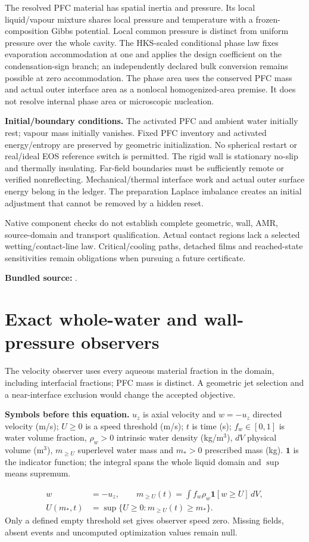\documentclass[10pt,a4paper]{article}
\newcommand{\symbols}[1]{\par\textbf{Symbols before this equation.} #1\par}
\newcommand{\source}[1]{\par{\small\textbf{Bundled source:} \path{#1}.}\par}
\newcommand{\nextsection}[1]{\clearpage\section{#1}}
\begin{document}
The resolved PFC material has spatial inertia and pressure. Its local liquid/vapour mixture shares local pressure and temperature with a frozen-composition Gibbs potential. Local common pressure is distinct from uniform pressure over the whole cavity. The HKS-scaled conditional phase law fixes evaporation accommodation at one and applies the design coefficient on the condensation-sign branch; an independently declared bulk conversion remains possible at zero accommodation. The phase area uses the conserved PFC mass and actual outer interface area as a nonlocal homogenized-area premise. It does not resolve internal phase area or microscopic nucleation.

\textbf{Initial/boundary conditions.} The activated PFC and ambient water initially rest; vapour mass initially vanishes. Fixed PFC inventory and activated energy/entropy are preserved by geometric initialization. No spherical restart or real/ideal EOS reference switch is permitted. The rigid wall is stationary no-slip and thermally insulating. Far-field boundaries must be sufficiently remote or verified nonreflecting. Mechanical/thermal interface work and actual outer surface energy belong in the ledger. The preparation Laplace imbalance creates an initial adjustment that cannot be removed by a hidden reset.

Native component checks do not establish complete geometric, wall, AMR, source-domain and transport qualification. Actual contact regions lack a selected wetting/contact-line law. Critical/cooling paths, detached films and reached-state sensitivities remain obligations when pursuing a future certificate.
\source{inputs/full_closure/PROBLEM_STATEMENT.md, sections 3 and 6}

\nextsection{Exact whole-water and wall-pressure observers}
The velocity observer uses every aqueous material fraction in the domain, including interfacial fractions; PFC mass is distinct. A geometric jet selection and a near-interface exclusion would change the accepted objective.

\symbols{$u_z$ is axial velocity and $w=-u_z$ directed velocity (m/s); $U\ge0$ is a speed threshold (m/s); $t$ is time (s); $f_w\in[0,1]$ is water volume fraction, $\rho_w>0$ intrinsic water density (kg/m$^3$), $dV$ physical volume (m$^3$), $m_{\ge U}$ superlevel water mass and $m_*>0$ prescribed mass (kg). $\mathbf1$ is the indicator function; the integral spans the whole liquid domain and $\sup$ means supremum.}
\begin{align}
w&=-u_z,\qquad m_{\ge U}(t)=\int f_w\rho_w\mathbf1[w\ge U]\,dV,\label{eq:massobserver}\\
U(m_*,t)&=\sup\{U\ge0:m_{\ge U}(t)\ge m_*\}.\label{eq:quantile}
\end{align}
Only a defined empty threshold set gives observer speed zero. Missing fields, absent events and uncomputed optimization values remain null.
\end{document}
